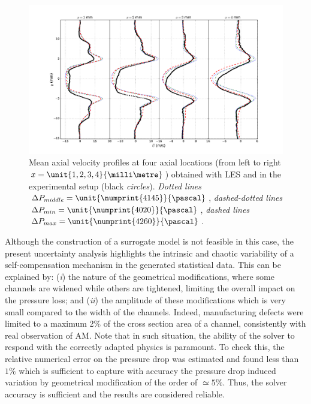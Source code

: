 \begin{figure}[!ht]
\centering
\includegraphics[width=\linewidth,keepaspectratio]{fig/applications/swirler/profile_u.pdf}
\caption{Mean axial velocity profiles at four axial locations (from left to right $x = \unit{1, 2, 3, 4}{\milli\metre}$) obtained with LES and in the experimental setup (black \emph{circles}). \emph{Dotted lines} $\Delta P_{middle} =\unit{\numprint{4145}}{\pascal} $, \emph{dashed-dotted lines}$\Delta P_{min} =\unit{\numprint{4020}}{\pascal} $, \emph{dashed lines} $\Delta P_{max} = \unit{\numprint{4260}}{\pascal}$.}
\label{fig:profile-u}
\end{figure}



Although the construction of a surrogate model is not feasible in this case, the present uncertainty analysis highlights the intrinsic and chaotic variability of a self-compensation mechanism in the generated statistical data. This can be explained by: (\emph{i}) the nature of the geometrical modifications, where some channels are widened while others are tightened, limiting the overall impact on the pressure loss; and (\emph{ii}) the amplitude of these modifications which is very small compared to the width of the channels. Indeed, manufacturing defects were limited to a maximum 2\% of the cross section area of a channel, consistently with real observation of AM. Note that in such situation, the ability of the solver to respond with the correctly adapted physics is paramount. To check this, the relative numerical error on the pressure drop was estimated and found less than $1\%$ which is sufficient to capture with accuracy the pressure drop induced variation by geometrical modification of the order of $\simeq 5\%$. Thus, the solver accuracy is sufficient and the results are considered reliable.


